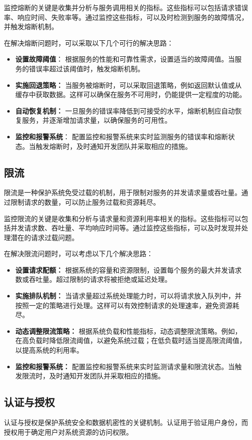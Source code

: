 监控熔断的关键是收集并分析与服务调用相关的指标。这些指标可以包括请求错误率、响应时间、失败率等。通过监控这些指标，可以及时检测到服务的故障情况，并触发熔断机制。

在解决熔断问题时，可以采取以下几个可行的解决思路：
\begin{itemize}
	\item \textbf{设置故障阈值}： 根据服务的性能和可靠性需求，设置适当的故障阈值。当服务的错误率超过该阈值时，触发熔断机制。
	\item \textbf{实施回退策略：} 当服务被熔断时，可以采取回退策略，例如返回默认值或从缓存中获取数据。这样可以确保在服务不可用时，仍能提供一定程度的功能。
	\item \textbf{自动恢复机制：} 一旦服务的错误率降低到可接受的水平，熔断机制应自动恢复服务，并逐渐增加请求量，以确保服务的可用性。
	\item \textbf{监控和报警系统}： 配置监控和报警系统来实时监测服务的错误率和熔断状态。当触发熔断时，及时通知开发团队并采取相应的措施。
\end{itemize}
\subsection{限流}
限流是一种保护系统免受过载的机制，用于限制对服务的并发请求量或吞吐量。通过限制请求的数量，可以防止服务过载和资源耗尽。

监控限流的关键是收集和分析与请求量和资源利用率相关的指标。这些指标可以包括并发请求数、吞吐量、平均响应时间等。通过监控这些指标，可以及时发现并处理潜在的请求过载问题。

在解决限流问题时，可以考虑以下几个解决思路：
\begin{itemize}
	\item \textbf{设置请求配额： }根据系统的容量和资源限制，设置每个服务的最大并发请求数或吞吐量。超过限制的请求将被拒绝或延迟处理。
	\item \textbf{实施排队机制： }当请求量超过系统处理能力时，可以将请求放入队列中，并按照一定的策略进行处理。这样可以有效控制请求的处理速率，避免资源耗尽。
	\item \textbf{动态调整限流策略： }根据系统负载和性能指标，动态调整限流策略。例如，在高负载时降低限流阈值，以避免系统过载；在低负载时适当提高限流阈值，以提高系统的利用率。
	\item \textbf{监控和报警系统： }配置监控和报警系统来实时监测请求量和限流状态。当触发限流时，及时通知开发团队并采取相应的措施。
\end{itemize}

\subsection{认证与授权}
认证与授权是保护系统安全和数据机密性的关键机制。认证用于验证用户身份，而授权用于确定用户对系统资源的访问权限。

